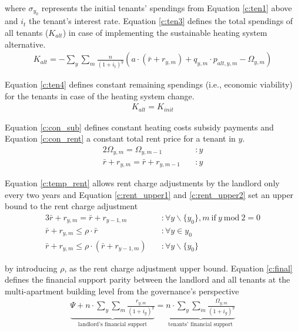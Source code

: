 where $\sigma_{y_0}$ represents the initial tenants' spendings from Equation \ref{c:ten1} above and $i_t$ the tenant's interest rate. Equation \ref{c:ten3} defines the total spendings of all tenants ($K_{alt}$) in case of implementing the sustainable heating system alternative.
\begin{align}\label{c:ten3}
	K_{alt} = -\sum_{y} \sum_{m} \frac{n}{(1+i_{t})^y} \left(a \cdot (\bar{r} + r_{y,m}) + q_{y,m} \cdot p_{alt,y,m}-\Omega_{y,m} \right)
\end{align}

Equation \ref{c:ten4} defines constant remaining spendings (i.e., economic viability) for the tenants in case of the heating system change.
\begin{align}\label{c:ten4}
K_{alt} = K_{init}
\end{align}

Equation \ref{c:con_sub} defines constant heating costs subsidy payments and Equation \ref{c:con_rent} a constant total rent price for a tenant in $y$.
\begin{alignat}{2}
\Omega_{y,m} = \Omega_{y,m-1} \quad &:y\label{c:con_sub}\\
\bar{r} + r_{y,m} = \bar{r} + r_{y,m-1} \quad &:y\label{c:con_rent}
\end{alignat}

Equation \ref{c:temp_rent} allows rent charge adjustments by the landlord only every two years and Equation \ref{c:rent_upper1} and \ref{c:rent_upper2} set an upper bound to the rent charge adjustment
\begin{alignat}{3}
\bar{r} + r_{y,m} = \bar{r} + r_{y-1,m} \quad &:\forall y\backslash \{y_0\},m~\text{if}~y~\text{mod}~2=0\label{c:temp_rent}\\
\bar{r}+r_{y,m} \leq \rho \cdot \bar{r} \quad &:\forall y \in {y_0}\label{c:rent_upper1}\\
\bar{r}+r_{y,m} \leq \rho \cdot \left(\bar{r}+r_{y-1,m}\right) \quad &:\forall y\backslash \{y_0\}\label{c:rent_upper2}
\end{alignat}

by introducing $\rho$, as the rent charge adjustment upper bound. Equation \ref{c:final} defines the financial support parity between the landlord and all tenants at the multi-apartment building level from the governance's perspective 
\begin{align}\label{c:final}
\underbrace{\Psi +  n \cdot \sum_{y} \sum_{m} \frac{r_{y,m}}{(1+i_{g})^y}}_{\text{landlord's financial support}}= \underbrace{n \cdot \sum_{y} \sum_{m} \frac{\Omega_{y,m}}{(1+i_{g})^y}}_{\text{tenants' financial support}}
\end{align}

